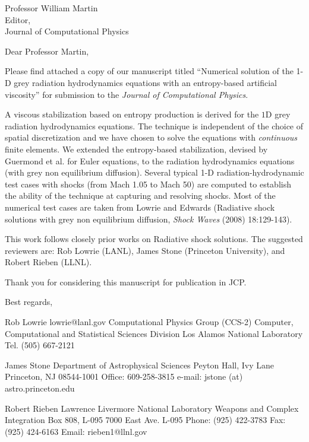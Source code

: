 \begin{letter}{Professor William Martin\\
    Editor,\\
    Journal of Computational Physics}
\date{\today}

\opening{Dear Professor Martin,}
         \vspace{0.25cm}

Please find attached a copy of our manuscript titled ``Numerical solution of the 1-D grey radiation hydrodynamics equations with an entropy-based artificial viscosity'' for submission to the {\em Journal of Computational Physics}. 

A viscous stabilization based on entropy production is derived for the $1$D grey radiation hydrodynamics equations. The technique is independent of the choice of spatial discretization and we have chosen to solve the equations with {\em continuous} finite elements. 
We extended the entropy-based stabilization, devised by Guermond et al. for Euler equations, to the radiation hydrodynamics equations (with grey non equilibrium diffusion).  Several typical 1-D radiation-hydrodynamic test cases with shocks (from Mach 1.05 to Mach 50) are computed to establish the ability of the technique at capturing and resolving shocks. Most of the numerical test cases are taken from Lowrie and Edwards (Radiative shock solutions with grey non equilibrium diffusion, {\it Shock Waves} (2008) 18:129-143).

 
This work follows closely prior works on Radiative shock solutions. The suggested reviewers are: Rob Lowrie (LANL), James Stone (Princeton University), and Robert Rieben (LLNL).
 

Thank you for considering this manuscript for publication in JCP.




\closing{Best regards, }

\end{letter}


Rob Lowrie
lowrie@lanl.gov
Computational Physics Group (CCS-2)
Computer, Computational and Statistical Sciences Division Los Alamos National Laboratory Tel. (505) 667-2121

James Stone
Department of Astrophysical Sciences
Peyton Hall, Ivy Lane
Princeton, NJ 08544-1001
Office: 609-258-3815
e-mail: jstone (at) astro.princeton.edu 

Robert Rieben
Lawrence Livermore National Laboratory
Weapons and Complex Integration
Box 808, L-095 
7000 East Ave. L-095
Phone: (925) 422-3783
Fax: (925) 424-6163
Email: rieben1@llnl.gov
